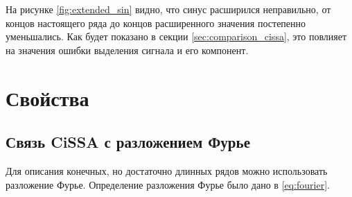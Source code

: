\documentclass[12pt, specialist, subf
]{disser}
\theoremstyle{definition}
\newcommand{\SSA}{\texttt{SSA}}
\newcommand{\CISSA}{\texttt{CiSSA}}
\newcommand{\TS}{\mathsf{X}}
\newtheorem{definition}{Определение} %
\newtheorem{theorem}{Теорема} %
\begin{document}
На рисунке \ref{fig:extended_sin} видно, что синус расширился неправильно, от концов настоящего ряда до концов расширенного значения постепенно уменьшались. Как будет показано в секции \ref{sec:comparison_cissa}, это повлияет на значения ошибки выделения сигнала и его компонент.




\section{Свойства}

%
%
%
%
%

\subsection{Связь CiSSA с разложением Фурье}
\label{subsec:cissa_fourier}
Для описания конечных, но достаточно длинных рядов можно использовать разложение Фурье. Определение разложения Фурье было дано в \eqref{eq:fourier}.
\end{document}
